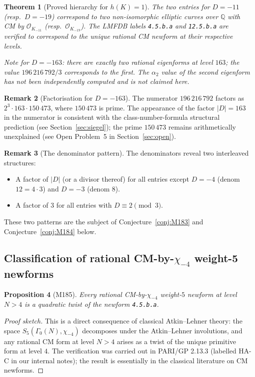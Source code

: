 \documentclass[12pt]{amsart}
\newtheorem{theorem}{Theorem}[section]
\newtheorem{proposition}[theorem]{Proposition}
\theoremstyle{definition}
\newtheorem{remark}[theorem]{Remark}
\newcommand{\Q}{\mathbb{Q}}
\newcommand{\OK}{\mathcal{O}_K}
\begin{document}
\begin{theorem}[Proved hierarchy for $h(K)=1$]
  The two entries for $D = -11$ (resp.\ $D = -19$) correspond to two
  non-isomorphic elliptic curves over $\Q$ with CM by $\OK_{-11}$
  (resp.\ $\OK_{-19}$).
  The LMFDB labels \texttt{4.5.b.a} and \texttt{12.5.b.a} are verified to
  correspond to the unique rational CM newform at their respective levels.

  \emph{Note for $D = -163$:} there are exactly two rational eigenforms at
  level $163$; the value $196\,216\,792/3$ corresponds to the first. The
  $\alpha_2$ value of the second eigenform has not been independently
  computed and is not claimed here.
\end{theorem}

\begin{remark}[Factorisation for $D = -163$]
  The numerator $196\,216\,792$ factors as $2^3 \cdot 163 \cdot 150\,473$,
  where $150\,473$ is prime.
  The appearance of the factor $|D| = 163$ in the numerator is consistent
  with the class-number-formula structural prediction (see
  Section~\ref{sec:siegel}); the prime $150\,473$ remains arithmetically
  unexplained (see Open Problem~5 in Section~\ref{sec:open}).
\end{remark}

\begin{remark}[The denominator pattern]
  The denominators reveal two interleaved structures:
  \begin{itemize}
    \item A factor of $|D|$ (or a divisor thereof) for all entries except
      $D=-4$ (denom $12 = 4 \cdot 3$) and $D=-3$ (denom $8$).
    \item A factor of $3$ for all entries with $D \equiv 2 \pmod 3$.
  \end{itemize}
  These two patterns are the subject of Conjecture~\ref{conj:M183} and
  Conjecture~\ref{conj:M184} below.
\end{remark}

\subsection{Classification of rational CM-by-\texorpdfstring{$\chi_{-4}$}{chi\_-4} weight-5 newforms}

\begin{proposition}[M185]
  \label{prop:M185}
  Every rational CM-by-$\chi_{-4}$ weight-$5$ newform at level $N > 4$
  is a quadratic twist of the newform \texttt{4.5.b.a}.
\end{proposition}

\begin{proof}[Proof sketch]
  This is a direct consequence of classical Atkin--Lehner theory: the space
  $S_5(\Gamma_0(N), \chi_{-4})$ decomposes under the Atkin--Lehner involutions,
  and any rational CM form at level $N > 4$ arises as a twist of the unique
  primitive form at level $4$.
  The verification was carried out in PARI/GP 2.13.3 (labelled HA-C in our
  internal notes); the result is essentially in the classical literature on CM
  newforms.
\end{proof}
\end{document}
